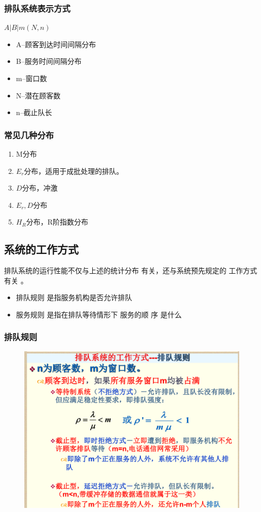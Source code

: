 \subsubsection{排队系统表示方式}
$A | B | m(N,n) $
\begin{itemize}
	\item A--顾客到达时间间隔分布
	\item B--服务时间间隔分布
	\item m--窗口数
	\item N--潜在顾客数
	\item n--截止队长
\end{itemize}
\subsubsection{常见几种分布}
\begin{enumerate}
	\item M分布
	\item $E_r$分布，适用于成批处理的排队。
	\item $D$分布，冲激
	\item $E_r,D$分布
	\item $H_R$分布，R阶指数分布
\end{enumerate}
\subsection{系统的工作方式}
排队系统的运行性能不仅与上述的统计分布
有关，还与系统预先规定的 工作方式有关 。
\begin{itemize}
	\item 排队规则 是指服务机构是否允许排队
	\item  服务规则 是指在排队等待情形下 服务的顺
	序 是什么
\end{itemize}
\subsubsection{排队规则}
\begin{figure}[H]
	\centering
	\includegraphics[width=0.7\linewidth]{figures/prove_3}
	\caption{}
	\label{fig:prove3}
\end{figure}

